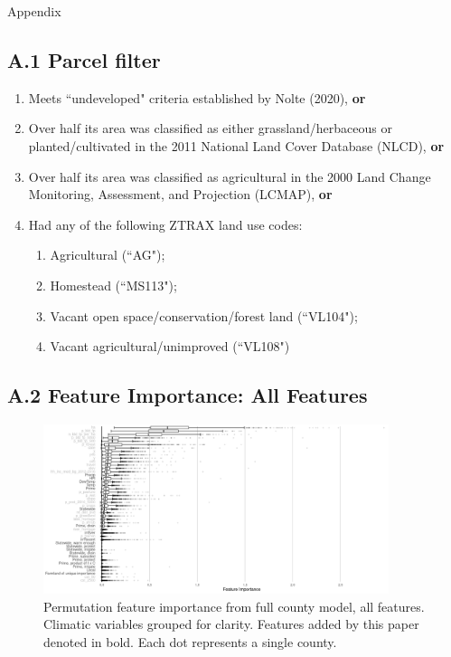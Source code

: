 \documentclass[12pt]{article}
\begin{document}
\begin{huge}
    \begin{center}
        Appendix
    \end{center}
\end{huge}

\newpage

\subsection*{A.1 Parcel filter}

\begin{enumerate}
    \item Meets ``undeveloped" criteria established by Nolte (2020), \textbf{or}
    \item Over half its area was classified as either grassland/herbaceous or planted/cultivated in the 2011 National Land Cover Database (NLCD), \textbf{or}
    \item Over half its area was classified as agricultural in the 2000 Land Change Monitoring, Assessment, and Projection (LCMAP), \textbf{or}
    \item Had any of the following ZTRAX land use codes:
    \begin{enumerate}
        \item Agricultural (``AG");
        \item Homestead (``MS113");
        \item Vacant open space/conservation/forest land (``VL104");
        \item Vacant agricultural/unimproved (``VL108")
    \end{enumerate}
\end{enumerate}

\newpage

\subsection*{A.2 Feature Importance: All Features}


\begin{figure}[H]
    \centering
    \includegraphics[width=0.9\textwidth]{exhibits/fcb_importance_all.png}
    \caption{Permutation feature importance from full county model, all features. Climatic variables grouped for clarity. Features added by this paper denoted in bold. Each dot represents a single county.}
    \label{fig:fcb_importance_all}
\end{figure}
\end{document}
